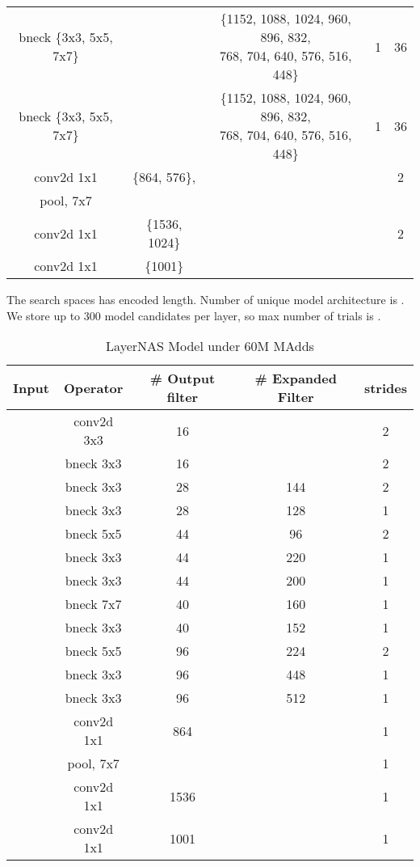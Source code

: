 \begin{table}
\begin{center}
\begin{tabular}[hp]{c|c|c|c|c}
  bneck \{3x3, 5x5, 7x7\} & &\shortstack{\{1152, 1088, 1024, 960, 896, 832, \\ 768, 704, 640, 576, 516, 448\}} &1 &36 \\
  bneck \{3x3, 5x5, 7x7\} & &\shortstack{\{1152, 1088, 1024, 960, 896, 832, \\ 768, 704, 640, 576, 516, 448\}} &1 &36 \\
\hline
  conv2d 1x1 &\{864, 576\}, & & &2\\
  pool, 7x7  & & &\\
  conv2d 1x1  &\{1536, 1024\} & & &2\\
  conv2d 1x1 &\{1001\} & & \\
\hline
\hline

\end{tabular}
\end{center}
\end{table}

The search spaces has  encoded length. Number of unique model architecture is .
We store up to 300 model candidates per layer, so max number of trials is .


\begin{table}
\caption{LayerNAS Model under 60M MAdds} 
\begin{center}

\begin{tabular}[hp]{c|c|c|c|c}
\hline
\hline
 Input &Operator  &\# Output filter &\# Expanded Filter &strides\\ 
\hline
  &conv2d 3x3 &16 & &2 \\
\hline
  &bneck 3x3 &16 & &2 \\
\hline
  &bneck 3x3 &28 &144 &2 \\
  &bneck 3x3 &28 &128 &1 \\
\hline
  &bneck 5x5 &44 &96 &2 \\
  &bneck 3x3 &44 &220 &1 \\
  &bneck 3x3 &44 &200 &1 \\
\hline
  &bneck 7x7 &40 &160 &1 \\
  &bneck 3x3 &40 &152 &1 \\
\hline
  &bneck 5x5 &96 &224 &2 \\
  &bneck 3x3 &96 &448 &1 \\
  &bneck 3x3 &96 &512 &1 \\
\hline
  &conv2d 1x1 &864 & &1 \\
  &pool, 7x7  & & &1\\
  &conv2d 1x1  &1536 & &1 \\
  &conv2d 1x1 &1001 & &1 \\
\hline
\hline

\end{tabular}
\end{center}
\end{table}





